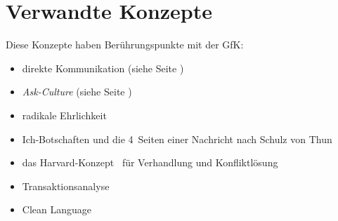 \section{Verwandte Konzepte}
\label{verwandte-konzepte}

Diese Konzepte haben Berührungspunkte mit der GfK:

\begin{itemize}
    \item direkte Kommunikation (siehe Seite \pageref{direkte-kommunikation})
    \item \emph{Ask-Culture} (siehe Seite \pageref{ask-guess-culture})
    \item radikale Ehrlichkeit~\cite{radical-candor, radical-honesty}
    \item Ich-Botschaften und die 4~Seiten einer Nachricht nach Schulz von Thun~\cite{miteinander-reden-1}
    \item das Harvard-Konzept~\cite{harvard-konzept} für Verhandlung und Konfliktlösung
    \item Transaktionsanalyse
    \item Clean Language
\end{itemize}
